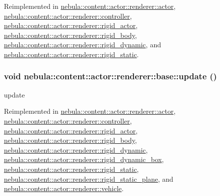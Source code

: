 Reimplemented in \hyperlink{classnebula_1_1content_1_1actor_1_1renderer_1_1actor_ab35c8c44d2603c17f4822cdef8be93bf}{nebula::content::actor::renderer::actor}, \hyperlink{classnebula_1_1content_1_1actor_1_1renderer_1_1controller_adb754b3908d5188268d532022879c07f}{nebula::content::actor::renderer::controller}, \hyperlink{classnebula_1_1content_1_1actor_1_1renderer_1_1rigid__actor_a4e0cda8bb08115a62cbb8363ac439608}{nebula::content::actor::renderer::rigid\_\-actor}, \hyperlink{classnebula_1_1content_1_1actor_1_1renderer_1_1rigid__body_a5e76495c7870d3b88c5b32888f9fa504}{nebula::content::actor::renderer::rigid\_\-body}, \hyperlink{classnebula_1_1content_1_1actor_1_1renderer_1_1rigid__dynamic_a2ba4e3e381092c03c39d21248d635621}{nebula::content::actor::renderer::rigid\_\-dynamic}, and \hyperlink{classnebula_1_1content_1_1actor_1_1renderer_1_1rigid__static_a1423732157573e9276023a54471b3f3a}{nebula::content::actor::renderer::rigid\_\-static}.\hypertarget{classnebula_1_1content_1_1actor_1_1renderer_1_1base_afcde5bb9124d7a6b81053c15b4322e0e}{
\subsubsection[{update}]{\setlength{\rightskip}{0pt plus 5cm}void nebula::content::actor::renderer::base::update ()}}
\label{classnebula_1_1content_1_1actor_1_1renderer_1_1base_afcde5bb9124d7a6b81053c15b4322e0e}


update 

Reimplemented in \hyperlink{classnebula_1_1content_1_1actor_1_1renderer_1_1actor_aec0ddac9c76aa3360fe97b49a651e1e2}{nebula::content::actor::renderer::actor}, \hyperlink{classnebula_1_1content_1_1actor_1_1renderer_1_1controller_ae71ff273d2d404f4b89de60ad0e21234}{nebula::content::actor::renderer::controller}, \hyperlink{classnebula_1_1content_1_1actor_1_1renderer_1_1rigid__actor_a650ae9b6164016a9180817d7b077326f}{nebula::content::actor::renderer::rigid\_\-actor}, \hyperlink{classnebula_1_1content_1_1actor_1_1renderer_1_1rigid__body_a11f37d90346888f7dc70cae54954a584}{nebula::content::actor::renderer::rigid\_\-body}, \hyperlink{classnebula_1_1content_1_1actor_1_1renderer_1_1rigid__dynamic_a53122ec3edecc185ebe31a8bb38be920}{nebula::content::actor::renderer::rigid\_\-dynamic}, \hyperlink{classnebula_1_1content_1_1actor_1_1renderer_1_1rigid__dynamic__box_af93072ba126df030c9eb4ec7d2898104}{nebula::content::actor::renderer::rigid\_\-dynamic\_\-box}, \hyperlink{classnebula_1_1content_1_1actor_1_1renderer_1_1rigid__static_a3e3b767391a538db88e91035cca7c3dd}{nebula::content::actor::renderer::rigid\_\-static}, \hyperlink{classnebula_1_1content_1_1actor_1_1renderer_1_1rigid__static__plane_a3ef08d440181a74d4428ebef83607963}{nebula::content::actor::renderer::rigid\_\-static\_\-plane}, and \hyperlink{classnebula_1_1content_1_1actor_1_1renderer_1_1vehicle_a46a276a1d4340857f6d11927d5127d56}{nebula::content::actor::renderer::vehicle}.

